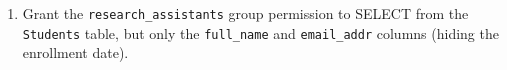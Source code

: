 \documentclass[12pt,a4paper]{article}
\begin{document}
\begin{enumerate}




\item Grant the \texttt{research\_assistants} group permission to SELECT from the \texttt{Students} table, but only the \texttt{full\_name} and \texttt{email\_addr} columns (hiding the enrollment date).
\end{enumerate}
\end{document}
